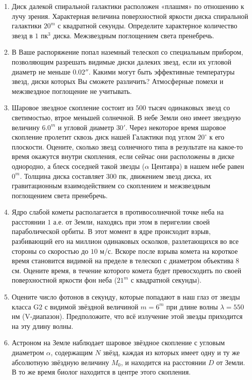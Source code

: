 \documentclass[12pt]{article}
\newcommand{\RomanNumeralCaps}[1]
{\MakeUppercase{\romannumeral #1}}
\begin{document}
\begin{enumerate}
    \item Диск далекой спиральной галактики расположен «плашмя» по отношению к лучу зрения. Характерная величина поверхностной яркости диска спиральной галактики $20^m$ с квадратной секунды. Определите характерное количество звезд в $1$ пк$^3$ диска. Межзвездным поглощением света пренебречь.
    \item В Ваше распоряжение попал наземный телескоп со специальным прибором, позволяющим разрешать видимые диски далеких звезд, если их угловой диаметр не меньше $0.02''$. Какими могут быть эффективные температуры звезд, диски которых Вы сможете различить? Атмосферные помехи и межзвездное поглощение не учитывать.
    \item Шаровое звездное скопление состоит из $500$ тысяч одинаковых звезд со светимостью, втрое меньшей солнечной. В небе Земли оно имеет звездную величину $6.0^m$ и угловой диаметр $30'$. Через некоторое время шаровое скопление пролетит сквозь диск нашей Галактики под углом $20^{\circ}$ к его плоскости. Оцените, сколько звезд солнечного типа в результате на какое-то время окажутся внутри скопления, если сейчас они расположены в диске однородно, а блеск соседней такой звезды ($\alpha$ Центавра) в нашем небе равен $0^m$. Толщина диска составляет $300$ пк, движением звезд диска, их гравитационным взаимодействием со скоплением и межзвездным поглощением света пренебречь.
    \item Ядро слабой кометы располагается в противосолнечной точке неба на расстоянии $1$ а.е. от Земли, находясь при этом в перигелии своей параболической орбиты. В этот момент в ядре происходит взрыв, разбивающий его на миллион одинаковых осколков, разлетающихся во все стороны со скоростью до $10$ м/с. Вскоре после взрыва комета на короткое время становится видимой на пределе в телескоп с диаметром объектива $8$ см. Оцените время, в течение которого комета будет превосходить по своей поверхностной яркости фон неба ($21^m$ с квадратной секунды).
    \item Оцените число фотонов в секунду, которые попадают в наш глаз от звезды класса G$2$\RomanNumeralCaps{5} с видимой звёздной величиной $m = 6^m$ при длине волны $\lambda = 550$ нм (V-диапазон). Предположите, что всё излучение этой звезды приходится на эту длину волны.
    \item Астроном на Земле наблюдает шаровое звёздное скопление с угловым диаметром $\alpha$, содержащим $N$ звёзд, каждая из которых имеет одну и ту же абсолютную звёздную величину $M_0$, и находится на расстоянии $D$ от Земли. В то же время биолог находится в центре этого скопления.

\end{enumerate}
\end{document}
